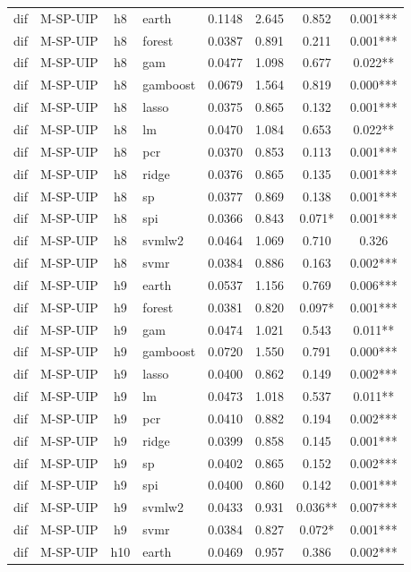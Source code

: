 \begin{ThreePartTable}
\begin{longtable}[t]{llclcccc}
\addlinespace
dif & M-SP-UIP & h8 & earth & 0.1148 & 2.645 & 0.852 & 0.001***\\
dif & M-SP-UIP & h8 & forest & 0.0387 & 0.891 & 0.211 & 0.001***\\
dif & M-SP-UIP & h8 & gam & 0.0477 & 1.098 & 0.677 & 0.022**\\
dif & M-SP-UIP & h8 & gamboost & 0.0679 & 1.564 & 0.819 & 0.000***\\
dif & M-SP-UIP & h8 & lasso & 0.0375 & 0.865 & 0.132 & 0.001***\\
dif & M-SP-UIP & h8 & lm & 0.0470 & 1.084 & 0.653 & 0.022**\\
dif & M-SP-UIP & h8 & pcr & 0.0370 & 0.853 & 0.113 & 0.001***\\
dif & M-SP-UIP & h8 & ridge & 0.0376 & 0.865 & 0.135 & 0.001***\\
dif & M-SP-UIP & h8 & sp & 0.0377 & 0.869 & 0.138 & 0.001***\\
dif & M-SP-UIP & h8 & spi & 0.0366 & 0.843 & 0.071* & 0.001***\\
dif & M-SP-UIP & h8 & svmlw2 & 0.0464 & 1.069 & 0.710 & 0.326\\
dif & M-SP-UIP & h8 & svmr & 0.0384 & 0.886 & 0.163 & 0.002***\\
\addlinespace
dif & M-SP-UIP & h9 & earth & 0.0537 & 1.156 & 0.769 & 0.006***\\
dif & M-SP-UIP & h9 & forest & 0.0381 & 0.820 & 0.097* & 0.001***\\
dif & M-SP-UIP & h9 & gam & 0.0474 & 1.021 & 0.543 & 0.011**\\
dif & M-SP-UIP & h9 & gamboost & 0.0720 & 1.550 & 0.791 & 0.000***\\
dif & M-SP-UIP & h9 & lasso & 0.0400 & 0.862 & 0.149 & 0.002***\\
dif & M-SP-UIP & h9 & lm & 0.0473 & 1.018 & 0.537 & 0.011**\\
dif & M-SP-UIP & h9 & pcr & 0.0410 & 0.882 & 0.194 & 0.002***\\
dif & M-SP-UIP & h9 & ridge & 0.0399 & 0.858 & 0.145 & 0.001***\\
dif & M-SP-UIP & h9 & sp & 0.0402 & 0.865 & 0.152 & 0.002***\\
dif & M-SP-UIP & h9 & spi & 0.0400 & 0.860 & 0.142 & 0.001***\\
dif & M-SP-UIP & h9 & svmlw2 & 0.0433 & 0.931 & 0.036** & 0.007***\\
dif & M-SP-UIP & h9 & svmr & 0.0384 & 0.827 & 0.072* & 0.001***\\
\addlinespace
dif & M-SP-UIP & h10 & earth & 0.0469 & 0.957 & 0.386 & 0.002***\\

\end{longtable}
\end{ThreePartTable}
